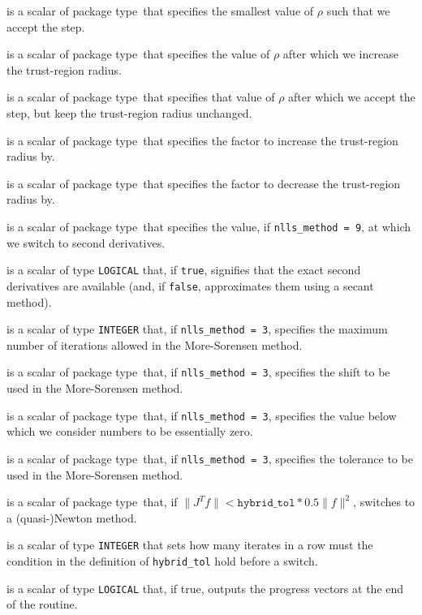 \documentclass{spec}
\newcommand{\scalarinteger}{is a scalar of type {\tt INTEGER} }
\newcommand{\scalarlogical}{is a scalar of type {\tt LOGICAL} }
\newcommand{\scalarreal}{is a scalar of package type\ }
\begin{document}
\begin{description}
 \scalarreal that specifies the smallest value of $\rho$ such that we accept the step.

 \scalarreal that specifies the value of $\rho$ after which we increase the trust-region radius.

 \scalarreal that specifies that value of $\rho$ after which we accept the step,
but keep the trust-region radius unchanged.

 \scalarreal that specifies the factor to increase the trust-region radius by.

 \scalarreal that specifies the factor to decrease the trust-region radius by.

 \scalarreal that specifies the value, if {\tt nlls\_method = 9},
at which we switch to second derivatives.

 \scalarlogical that, if {\tt true}, signifies that the
exact second derivatives are available (and, if {\tt false}, approximates them using a secant method).

 \scalarinteger that, if {\tt nlls\_method = 3}, specifies the maximum number of iterations allowed in the More-Sorensen method.

 \scalarreal that, if {\tt nlls\_method = 3}, specifies the shift to be used in the More-Sorensen method.

 \scalarreal that, if {\tt nlls\_method = 3}, specifies the value
below which we consider numbers to be essentially zero.

 \scalarreal that, if {\tt nlls\_method = 3}, specifies the tolerance
to be used in the More-Sorensen method.

 \scalarreal that, if \(\|J^T f \| < \mathtt{hybrid\_tol} * 0.5 \|f\|^2\), switches to a (quasi-)Newton method.

 \scalarinteger that sets how many iterates in a row must
the condition in the definition of {\tt hybrid\_tol} hold before a switch.

 \scalarlogical that, if true, outputs the progress vectors at the end of the routine.

\end{description}
\end{document}
